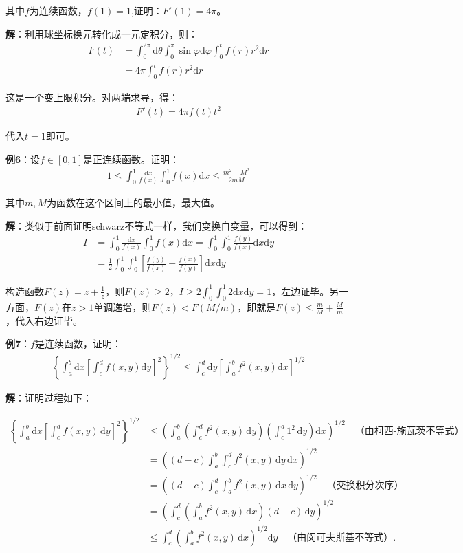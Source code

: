 \documentclass{ctexart}
\let\oldtextbf\textbf
\renewcommand{\textbf}[1]{\textcolor{brown!50!red}{\oldtextbf{#1}}}
\begin{document}
其中$f$为连续函数，$f(1)=1$,证明：$F'(1)=4\pi$。

\textbf{\color{brown!50!red}解}：利用球坐标换元转化成一元定积分，则：
\begin{align*} 
F(t)&=\int_0^{2\pi}\mathrm{d}\theta\int_0^\pi \sin\varphi\mathrm{d}\varphi\int_0^t f(r)r^2\mathrm{d}r\\
 &=4\pi\int_0^t f(r)r^2\mathrm{d}r
\end{align*}

这是一个变上限积分。对两端求导，得：
\begin{align*} 
F'(t)=4\pi f(t)t^2
\end{align*}

代入$t=1$即可。

\textbf{\color{brown!50!red}例6}：设$f\in[0,1]$是正连续函数。证明：
\begin{align*} 
1\leq\int_0^1\frac{\mathrm{d}x}{f(x)}\int_0^1f(x)\mathrm{d}x\leq\frac{m^2+M^2}{2mM}   
\end{align*}

其中$m,M$为函数在这个区间上的最小值，最大值。

\textbf{\color{brown!50!red}解}：类似于前面证明schwarz不等式一样，我们变换自变量，可以得到：
\begin{align*} 
I&=\int_0^1\frac{\mathrm{d}x}{f(x)}\int_0^1f(x)\mathrm{d}x=\int_0^1\int_0^1\frac{f(y)}{f(x)}\mathrm{d}x
\mathrm{d}y\\
&=\frac{1}2\int_0^1\int_0^1\left[\frac{f(y)}{f(x)}+\frac{f(x)}{f(y)} \right]\mathrm{d}x
\mathrm{d}y    
\end{align*}

构造函数$F(z)=z+\frac{1}{z}$，则$F(z)\geq 2$，$I\geq 2\int_0^1\int_0^1 2\mathrm{d}x\mathrm{d}y=1$，左边证毕。另一方面，$F(z)$在$z>1$单调递增，则$F(z)<F(M/m)$，即就是$F(z)\leq \frac{m}{M}+\frac{M}{m}$，代入右边证毕。

\textbf{\color{brown!50!red}例7}：$f$是连续函数，证明：
\begin{align*} 
\left \{ \int_a^b\mathrm{d}x\left[\int_c^d f(x,y)\mathrm{d}y \right]^2  \right \}^{1/2}
\leq \int_c^d\mathrm{d} y\left[\int_a^b f^2(x,y)\mathrm{d}x \right]^{1/2}
\end{align*}

\textbf{\color{brown!50!red}解}：\noindent 证明过程如下：

\begin{align*}
\left\{ \int_a^b \mathrm{d}x \left[ \int_c^d f(x,y) \, \mathrm{d}y \right]^2 \right\}^{1/2}
&\leq \left( \int_a^b \left( \int_c^d f^2(x,y) \, \mathrm{d}y \right) \left( \int_c^d 1^2 \, \mathrm{d}y \right) \mathrm{d}x \right)^{1/2} \quad \text{（由柯西-施瓦茨不等式）} \\
&= \left( (d - c) \int_a^b \int_c^d f^2(x,y) \, \mathrm{d}y \, \mathrm{d}x \right)^{1/2} \\
&= \left( (d - c) \int_c^d \int_a^b f^2(x,y) \, \mathrm{d}x \, \mathrm{d}y \right)^{1/2} \quad \text{（交换积分次序）} \\
&= \left( \int_c^d \left( \int_a^b f^2(x,y) \, \mathrm{d}x \right) (d - c) \, \mathrm{d}y \right)^{1/2} \\
&\leq \int_c^d \left( \int_a^b f^2(x,y) \, \mathrm{d}x \right)^{1/2} \mathrm{d}y \quad \text{（由闵可夫斯基不等式）}.
\end{align*}
\end{document}
